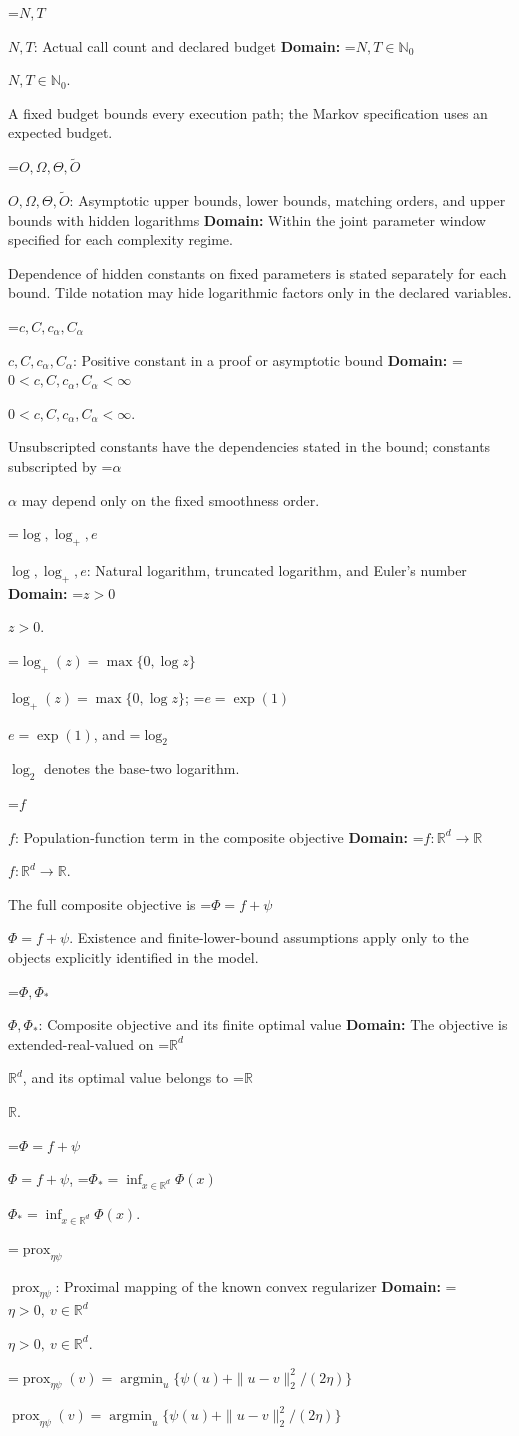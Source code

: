 \documentclass[10pt,a4paper]{article}
\newcommand{\AtlasMath}[1]{\par\begingroup\centering\setbox0=\hbox{$\displaystyle #1$}\ifdim\wd0>1.4\linewidth\typeout{ATLAS WIDE FORMULA: \the\wd0}\fi\ifdim\wd0>\linewidth\resizebox{\linewidth}{!}{\box0}\else\box0\fi\par\endgroup}
\newcommand{\AtlasInlineMath}[1]{\begingroup\setbox0=\hbox{$#1$}\ifdim\wd0>.4\linewidth\endgroup\AtlasMath{#1}\else\endgroup$#1$\fi}
\begin{document}
\AtlasInlineMath{N,T}: Actual call count and declared budget \textbf{Domain:} \AtlasInlineMath{N,T\in\mathbb{N}_0}.

A fixed budget bounds every execution path; the Markov specification uses an expected budget.

\AtlasInlineMath{O,\Omega,\Theta,\widetilde{O}}: Asymptotic upper bounds, lower bounds, matching orders, and upper bounds with hidden logarithms \textbf{Domain:} Within the joint parameter window specified for each complexity regime.

Dependence of hidden constants on fixed parameters is stated separately for each bound. Tilde notation may hide logarithmic factors only in the declared variables.

\AtlasInlineMath{c,C,c_\alpha,C_\alpha}: Positive constant in a proof or asymptotic bound \textbf{Domain:} \AtlasInlineMath{0<c,C,c_\alpha,C_\alpha<\infty}.

Unsubscripted constants have the dependencies stated in the bound; constants subscripted by \AtlasInlineMath{\alpha} may depend only on the fixed smoothness order.

\AtlasInlineMath{\log,\log_+,e}: Natural logarithm, truncated logarithm, and Euler's number \textbf{Domain:} \AtlasInlineMath{z>0}.

\AtlasInlineMath{\log_+(z)=\max\{0,\log z\}}; \AtlasInlineMath{e=\exp(1)}, and \AtlasInlineMath{\log_2} denotes the base-two logarithm.

\AtlasInlineMath{f}: Population-function term in the composite objective \textbf{Domain:} \AtlasInlineMath{f:\mathbb{R}^d\to\mathbb{R}}.

The full composite objective is \AtlasInlineMath{\Phi=f+\psi}. Existence and finite-lower-bound assumptions apply only to the objects explicitly identified in the model.

\AtlasInlineMath{\Phi,\Phi_*}: Composite objective and its finite optimal value \textbf{Domain:} The objective is extended-real-valued on \AtlasInlineMath{\mathbb{R}^d}, and its optimal value belongs to \AtlasInlineMath{\mathbb{R}}.

\AtlasInlineMath{\Phi=f+\psi}, \AtlasInlineMath{\Phi_*=\inf_{x\in\mathbb{R}^d}\Phi(x)}.

\AtlasInlineMath{\operatorname{prox}_{\eta\psi}}: Proximal mapping of the known convex regularizer \textbf{Domain:} \AtlasInlineMath{\eta>0,\ v\in\mathbb{R}^d}.

\AtlasInlineMath{\operatorname{prox}_{\eta\psi}(v)=\operatorname{argmin}_u\{\psi(u)+\|u-v\|_2^2/(2\eta)\}}
\end{document}
